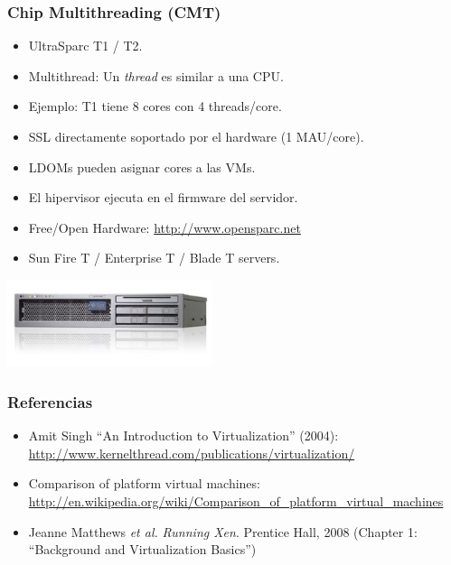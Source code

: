 \documentclass{beamer}
\begin{document}

\begin{frame}
\frametitle{Chip Multithreading (CMT)}

\begin{itemize}
\item UltraSparc T1 / T2.
\item \alert{Multithread}: Un \textit{thread} es similar a una CPU.
\item Ejemplo: T1 tiene 8 cores con 4 threads/core.
\item SSL directamente soportado por el hardware (1 MAU/core).
\item LDOMs pueden asignar cores a las VMs.
\item El hipervisor ejecuta en el firmware del servidor.
\item Free/Open Hardware: \url{http://www.opensparc.net}
\item Sun Fire T / Enterprise T / Blade T servers.
\end{itemize}

\begin{center}
\includegraphics[width=6cm,clip=false]{figs/sparcT1.png}
\end{center}

\end{frame}



\begin{frame}
\frametitle{Referencias}

\begin{itemize}

\item Amit Singh ``An Introduction to Virtualization'' (2004): \\
\url{http://www.kernelthread.com/publications/virtualization/}
\item Comparison of platform virtual machines: \url{http://en.wikipedia.org/wiki/Comparison_of_platform_virtual_machines}
\item Jeanne Matthews \textit{et al.} \textit{Running Xen}. Prentice Hall, 2008 (Chapter 1: ``Background and Virtualization Basics'')

\end{itemize}

\end{frame}

\end{document}
